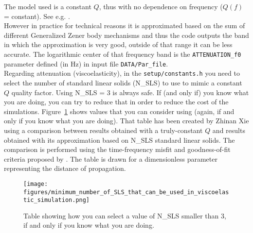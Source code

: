 \noindent
The model used is a constant $Q$, thus with no dependence on frequency ($Q(f)$ = constant).
See e.g. \cite{BlKoChLoXi16}. \\

\noindent
However in practice for technical reasons it is approximated based on the sum of different Generalized Zener body mechanisms
and thus the code outputs the band in which the approximation is very good, outside of that range it can be less accurate.
The logarithmic center of that frequency band is the \texttt{ATTENUATION\_f0} parameter defined (in Hz) in input file \texttt{DATA/Par\_file}. \\

\noindent
Regarding attenuation (viscoelasticity), in the \texttt{setup/constants.h} you need to select the number of standard linear solids (N\_SLS) to use to mimic a constant $Q$ quality factor.
Using N\_SLS = 3 is always safe. If (and only if) you know what you are doing, you can try to reduce that in order to reduce the cost of the simulations.
Figure~\ref{fig:selectNSLS} shows values that you can consider using (again, if and only if you know what you are doing). That table has been created by Zhinan Xie using
a comparison between results obtained with a truly-constant $Q$ and results obtained with its approximation based on N\_SLS standard linear solids.
The comparison is performed using the time-frequency misfit and goodness-of-fit criteria proposed by \cite{Kristekova_2009}.
The table is drawn for a dimensionless parameter representing the distance of propagation.
\begin{figure}[htbp]
\centering
\texttt{[image: figures/minimum\_number\_of\_SLS\_that\_can\_be\_used\_in\_viscoelastic\_simulation.png]}
\caption{Table showing how you can select a value of N\_SLS smaller than 3, if and only if you know what you are doing.}
\label{fig:selectNSLS}
\end{figure}

